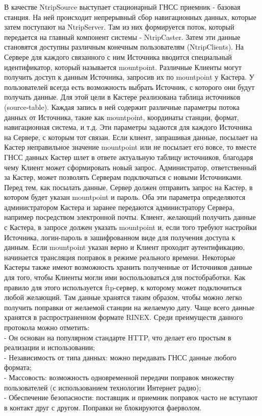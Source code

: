 \documentclass[a4paper,12pt]{report}
\begin{document}
В качестве NtripSource выступает стационарный ГНСС приемник - базовая станция. На ней происходит непрерывный сбор навигационных данных, которые 
затем поступают на NtripServer. Там из них формируется поток, который передается на главный компонент системы - NtripCaster. Затем эти данные 
становятся доступны различным конечным пользователям (NtripClients). На Сервере для каждого связанного с ним Источника вводится специальный 
идентификатор, который называется mountpoint. Различные Клиенты могут получить доступ к данным Источника, запросив их по mountpoint у Кастера. 
У пользователей всегда есть возможность выбрать Источник, с которого они будут получать данные. Для этой цели в Кастере реализована таблица 
источников (source-table). Каждая запись в ней содержит различные параметры потока данных от Источника, такие как mountpoint, координаты 
станции, формат, навигационная система, и т.д. Эти параметры задаются для каждого Источника на Сервере, с которым тот связан. Если клиент, 
запрашивая данные, посылает на Кастер неправильное значение mountpoint или не посылает его вовсе, то вместе ГНСС данных Кастер шлет в ответе 
актуальную таблицу источников, благодаря чему Клиент может сформировать новый запрос. Администратор, ответственный за Кастер, может позволять 
Серверам подключаться с новыми Источниками. Перед тем, как посылать данные, Сервер должен отправить запрос на Кастер, в котором будет указан 
mountpoint и пароль. Оба эти параметра определяются администратором Кастера и заранее передаются администратору Сервера, например посредством 
электронной почты. Клиент, желающий получить данные с Кастера, в запросе должен указать mountpoint и, если того требуют настройки Источника, 
логин-пароль в зашифрованном виде для получения доступа к данным. Если mountpoint указан верно и Клиент проходит аутентификацию, начинается 
трансляция поправок в режиме реального времени. Некоторые Кастеры также имеют возможность хранить полученные от Источников данные для того, 
чтобы Клиенты могли ими воспользоваться для постобработки. Как правило для этого используется ftp-сервер, к которому может подключиться любой 
желающий. Там данные хранятся таким образом, чтобы можно легко получить поправки от желаемой станции на желаемую дату. Чаще всего данные 
хранятся в распространенном формате RINEX.
Среди преимуществ данного протокола можно отметить: \\
- Он основан на популярном стандарте HTTP, что делает его простым в реализации и использовании; \\
- Независимость от типа данных: можно передавать ГНСС данные любого формата; \\ 
- Массовость: возможность одновременной передачи поправок множеству пользователей (с использованием технологии Интернет радио); \\
- Обеспечение безопасности: поставщик и приемник поправок часто не вступают в контакт друг с другом. Поправки не блокируются фаерволом. \\
\end{document}
